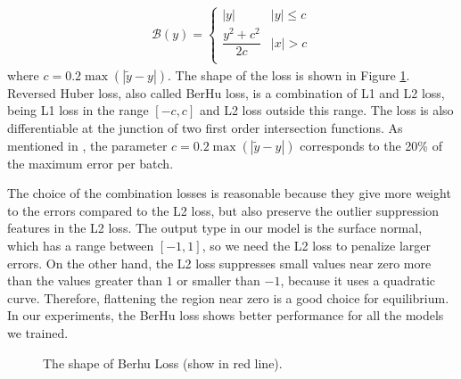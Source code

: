 \begin{equation}\label{berhu-loss}
	\begin{array}{ll}
		\mathcal{B}(y)= \begin{cases}
			|y| & |y| \le c \\
			\dfrac{y^2 + c^2}{2c} & |x| > c\\
		\end{cases}
	\end{array}
\end{equation}
where $ c=0.2\max (|\tilde y - y|) $. The shape of the loss is shown in Figure \ref{fig:berhu-loss-shape}. Reversed Huber loss, also called BerHu loss, is a combination of L1 and L2 loss, being L1 loss in the range $ [-c,c] $ and L2 loss outside this range. The loss is also differentiable at the junction of two first order intersection functions. As mentioned in \cite{img2depth}, the parameter $ c=0.2 \max(|\tilde y - y|) $ corresponds to the 20\% of the maximum error per batch. 

The choice of the combination losses is reasonable because they give more weight to the errors compared to the L2 loss, but also preserve the outlier suppression features in the L2 loss. The output type in our model is the surface normal, which has a range between $[-1,1] $, so we need the L2 loss to penalize larger errors. On the other hand, the L2 loss suppresses small values near zero more than the values greater than $ 1 $ or smaller than $ -1 $, because it uses a quadratic curve. Therefore, flattening the region near zero is a good choice for equilibrium. In our experiments, the BerHu loss shows better performance for all the models we trained.

\begin{figure}[H]
	\centering
	\captionsetup{width=\linewidth}
	\caption{The shape of Berhu Loss (show in red line). }
	\label{fig:berhu-loss-shape}
\end{figure}


